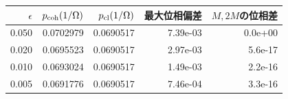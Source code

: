 \begin{tabular}{rrrrr}\toprule
$\epsilon$ & $p_{\rm coh}(1/\Omega)$ & $p_{\rm cl}(1/\Omega)$ & 最大位相偏差 & $M,2M$の位相差\\\midrule
0.050 & 0.0702979 & 0.0690517 & 7.39e-03 & 0.0e+00 \\
0.020 & 0.0695523 & 0.0690517 & 2.97e-03 & 5.6e-17 \\
0.010 & 0.0693024 & 0.0690517 & 1.49e-03 & 2.2e-16 \\
0.005 & 0.0691776 & 0.0690517 & 7.46e-04 & 3.3e-16 \\
\bottomrule\end{tabular}
